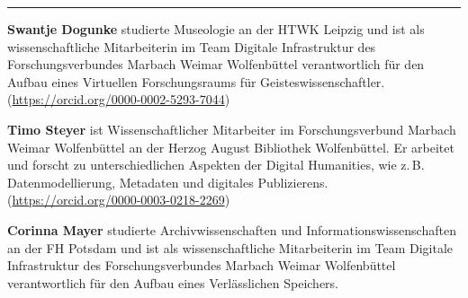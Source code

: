 \begin{center}\rule{0.5\linewidth}{\linethickness}\end{center}

\textbf{Swantje Dogunke} studierte Museologie an der HTWK Leipzig und
ist als wissenschaftliche Mitarbeiterin im Team Digitale Infrastruktur
des Forschungsverbundes Marbach Weimar Wolfenbüttel verantwortlich für
den Aufbau eines Virtuellen Forschungsraums für Geisteswissenschaftler.
(\href{https://orcid.org/0000-0002-5293-7044}{https://orcid.org/0000-0002-5293-7044})

\textbf{Timo Steyer} ist Wissenschaftlicher Mitarbeiter im
Forschungsverbund Marbach Weimar Wolfenbüttel an der Herzog August
Bibliothek Wolfenbüttel. Er arbeitet und forscht zu unterschiedlichen
Aspekten der Digital Humanities, wie z.\,B. Datenmodellierung, Metadaten
und digitales Publizierens. (\href{https://orcid.org/0000-0003-0218-2269}{https://orcid.org/0000-0003-0218-2269})

\textbf{Corinna Mayer} studierte Archivwissenschaften und
Informationswissenschaften an der FH Potsdam und ist als
wissenschaftliche Mitarbeiterin im Team Digitale Infrastruktur des
Forschungsverbundes Marbach Weimar Wolfenbüttel verantwortlich für den
Aufbau eines Verlässlichen Speichers.